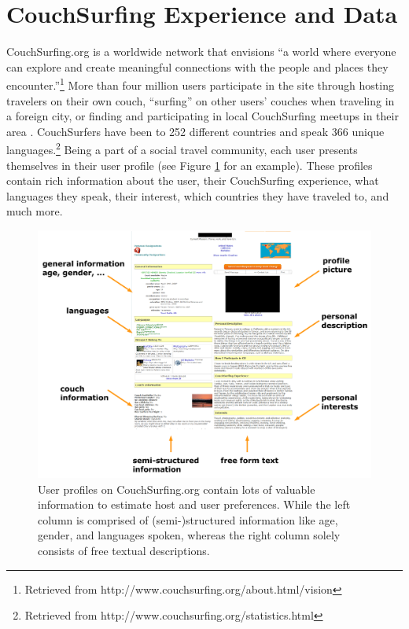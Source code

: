 \section{CouchSurfing Experience and Data} \label{sec:data}

CouchSurfing.org is a worldwide network that envisions ``a world where everyone can explore and create meaningful connections with the people and places they encounter.''\footnote{Retrieved from http://www.couchsurfing.org/about.html/vision}
More than four million users participate in the site through hosting travelers on their own couch, ``surfing'' on other users' couches when traveling in a foreign city, or finding and participating in local CouchSurfing meetups in their area \cite{lauterbach2009surfing}. CouchSurfers have been to 252 different countries and speak 366 unique languages.\footnote{Retrieved from http://www.couchsurfing.org/statistics.html}
Being a part of a social travel community, each user presents themselves in their user profile (see Figure \ref{fig:csprofile} for an example). These profiles contain rich information about the user, their CouchSurfing experience, what languages they speak, their interest, which countries they have traveled to, and much more.

\begin{figure}[ht]
\centering
\includegraphics[width=1\linewidth]{./figures/csprofile.pdf}
\caption{User profiles on CouchSurfing.org contain lots of valuable information to estimate host and user preferences. While the left column is comprised of (semi-)structured information like age, gender, and languages spoken, whereas the right column solely consists of free textual descriptions.}
\label{fig:csprofile}
\end{figure}

